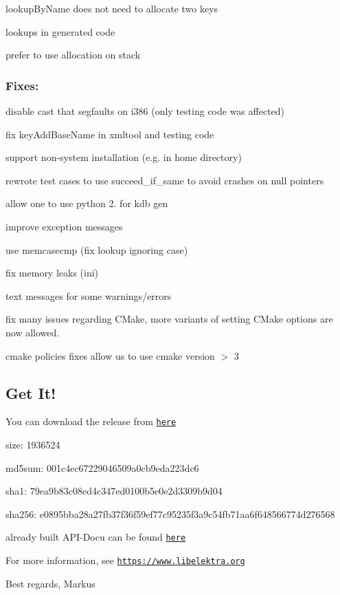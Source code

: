 \begin{DoxyItemize}
\item lookup\+By\+Name does not need to allocate two keys
\item lookups in generated code
\item prefer to use allocation on stack
\end{DoxyItemize}

\subsubsection*{Fixes\+:}


\begin{DoxyItemize}
\item disable cast that segfaults on i386 (only testing code was affected)
\item fix key\+Add\+Base\+Name in xmltool and testing code
\item support non-\/system installation (e.\+g. in home directory)
\item rewrote test cases to use succeed\+\_\+if\+\_\+same to avoid crashes on null pointers
\item allow one to use python 2. for kdb gen
\item improve exception messages
\item use memcasecmp (fix lookup ignoring case)
\item fix memory leaks (ini)
\item text messages for some warnings/errors
\item fix many issues regarding C\+Make, more variants of setting C\+Make options are now allowed.
\item cmake policies fixes allow us to use cmake version $>$ 3
\end{DoxyItemize}

\subsection*{Get It!}

You can download the release from \href{http://www.markus-raab.org/ftp/elektra/releases/elektra-0.8.9.tar.gz}{\tt here}


\begin{DoxyItemize}
\item size\+: 1936524
\item md5sum\+: 001c4ec67229046509a0cb9eda223dc6
\item sha1\+: 79ea9b83c08ed4c347ed0100b5e0e2d3309b9d04
\item sha256\+: e0895bba28a27fb37f36f59ef77c95235f3a9c54fb71aa6f648566774d276568
\end{DoxyItemize}

already built A\+P\+I-\/\+Docu can be found \href{https://doc.libelektra.org/api/0.8.9/html/}{\tt here}

For more information, see \href{https://www.libelektra.org}{\tt https\+://www.\+libelektra.\+org}

Best regards, Markus 